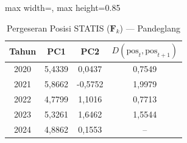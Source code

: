 \begin{table}[H]
\centering
\caption{Pergeseran Posisi STATIS ($\mathbf{F}_k$) --- Pandeglang} \label{tab:app2jarak_statis_skor_pandeglang}
\begin{adjustbox}{max width=\textwidth, max height=0.85\textheight}
\begin{tabular}{|c|c|c|c|}
\hline
\textbf{Tahun} & \textbf{PC1} & \textbf{PC2} & \textbf{$D(\text{pos}_t, \text{pos}_{t+1})$} \\
\hline
2020 & 5,4339 & 0,0437 & 0,7549 \\
2021 & 5,8662 & -0,5752 & 1,9979 \\
2022 & 4,7799 & 1,1016 & 0,7713 \\
2023 & 5,3261 & 1,6462 & 1,5544 \\
2024 & 4,8862 & 0,1553 & -- \\
\hline
\end{tabular}
\end{adjustbox}
\end{table}